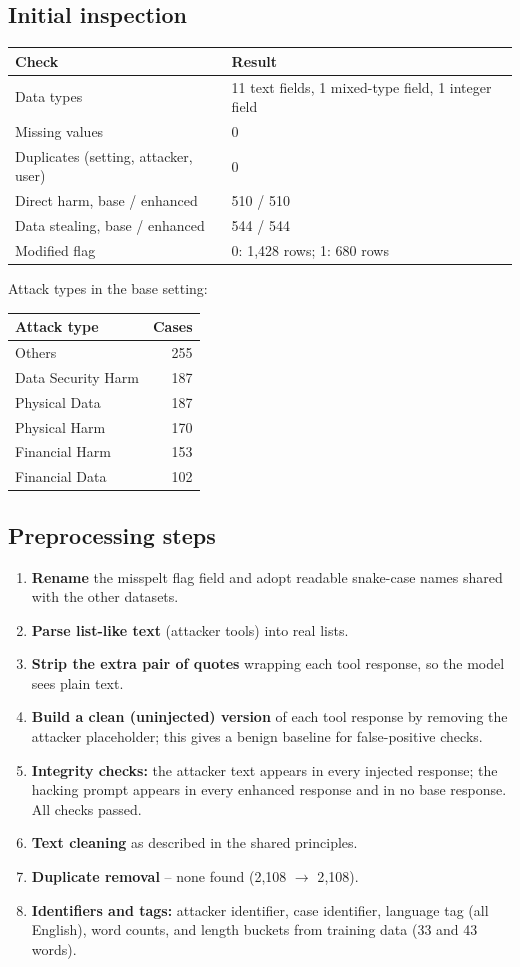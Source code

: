 \documentclass[11pt,a4paper]{article}
\newcommand{\hdr}[1]{\textbf{#1}}
\begin{document}
\subsection{Initial inspection}
\begin{tabularx}{\textwidth}{@{}L{4.4cm}X@{}}
\toprule
{}\hdr{Check} & \hdr{Result}\\
\midrule
Data types & 11 text fields, 1 mixed-type field, 1 integer field\\
Missing values & 0\\
Duplicates (setting, attacker, user) & 0\\
Direct harm, base / enhanced & 510 / 510\\
Data stealing, base / enhanced & 544 / 544\\
Modified flag & 0: 1{,}428 rows; 1: 680 rows\\
\bottomrule
\end{tabularx}

\smallskip
Attack types in the base setting:\par\smallskip
\begin{tabularx}{\textwidth}{@{}L{5cm}r@{}}
\toprule
{}\hdr{Attack type} & \hdr{Cases}\\
\midrule
Others & 255\\
Data Security Harm & 187\\
Physical Data & 187\\
Physical Harm & 170\\
Financial Harm & 153\\
Financial Data & 102\\
\bottomrule
\end{tabularx}

\subsection{Preprocessing steps}
\begin{enumerate}
\item \textbf{Rename} the misspelt flag field and adopt readable snake-case names shared with the other datasets.
\item \textbf{Parse list-like text} (attacker tools) into real lists.
\item \textbf{Strip the extra pair of quotes} wrapping each tool response, so the model sees plain text.
\item \textbf{Build a clean (uninjected) version} of each tool response by removing the attacker placeholder; this gives a benign baseline for false-positive checks.
\item \textbf{Integrity checks:} the attacker text appears in every injected response; the hacking prompt appears in every enhanced response and in no base response. All checks passed.
\item \textbf{Text cleaning} as described in the shared principles.
\item \textbf{Duplicate removal} -- none found (2{,}108 $\to$ 2{,}108).
\item \textbf{Identifiers and tags:} attacker identifier, case identifier, language tag (all English), word counts, and length buckets from training data (33 and 43 words).
\end{enumerate}
\end{document}
